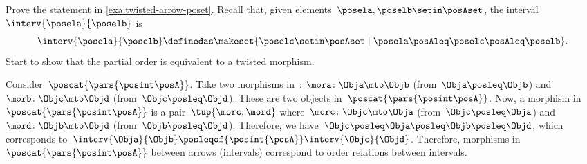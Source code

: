 \begin{exercise}
    Prove the statement in \cref{exa:twisted-arrow-poset}.
    Recall that, given elements~$\posela, \poselb \setin \posAset$, the interval~$\interv{\posela}{\poselb}$ is
    \begin{equation}
        \interv{\posela}{\poselb}
        \definedas \makeset{\poselc \setin \posAset \mid \posela\posAleq \poselc \posAleq \poselb}.
    \end{equation}
    Start to show that the partial order is equivalent to a twisted morphism.
\end{exercise}
\begin{solution}
    Consider~$\poscat{\pars{\posint\posA}}$.
    Take two morphisms in~\posA: $\mora\colon \Obja \mto \Objb$ (from~$\Obja \posleq \Objb$) and $\morb\colon \Objc\mto \Objd$ (from~$\Objc \posleq \Objd$).
    These are two objects in~$\poscat{\pars{\posint\posA}}$.
    Now, a morphism in~$\poscat{\pars{\posint\posA}}$ is a pair~$\tup{\morc,\mord}$ where~$\morc\colon \Objc \mto \Obja$ (from~$\Objc\posleq \Obja$) and~$\mord\colon \Objb \mto \Objd$ (from~$\Objb\posleq \Objd$).
    Therefore, we have~$\Objc\posleq \Obja\posleq \Objb\posleq \Objd$, which corresponds to~$\interv{\Obja}{\Objb}\posleqof{\posint{\posA}}\interv{\Objc}{\Objd}$.
    Therefore, morphisms in~$\poscat{\pars{\posint\posA}}$ between arrows (intervals) correspond to order relations between intervals.
\end{solution}

